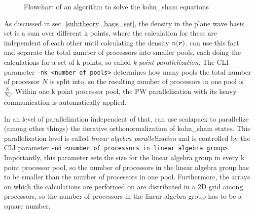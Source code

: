 \documentclass[main.tex]{subfiles}
\begin{document}
\begin{wrapfigure}{l}{0.5\textwidth}
\centering
{}
\label{fig:diagram_scf_calculations}
\caption{Flowchart of an algorithm to solve the \acrshort{kohn_sham} equations}
\end{wrapfigure}

As discussed in sec. \ref{sub:theory_basis_set}, the density in the plane wave basis set is a sum over different k points, where the calculation for these are independent of each other until calculating the density \(n( \vb*{r})\).
\QE can use this fact and separate the total number of processors into smaller pools, each doing the calculations for a set of k points, so called \emph{k point parallelization}.
The CLI parameter \texttt{-nk <number of pools>} determines how many pools the total number of processor \(N\) is split into, so the resulting number of processors in one pool is \(\frac{N}{N_k}\).
Within one k point processor pool, the PW parallelization with its heavy communication is automatically applied.

In an level of parallelization independent of that, \QE can use \gls{scalapack} to parallelize (among other things) the iterative orthonormalization of \acrshort{kohn_sham} states.
This parallelization level is called \emph{linear algebra parallelization} and is controlled by the CLI parameter \texttt{-nd <number of processors in linear algebra group>}.
Importantly, this parameter sets the size for the linear algebra group in every k point processor pool, so the number of processors in the linear algebra group has to be smaller than the number of processors in one pool.
Furthermore, the arrays on which the calculations are performed on are distributed in a 2D grid among processors, so the number of processors in the linear algebra group has to be a square number.
\end{document}
